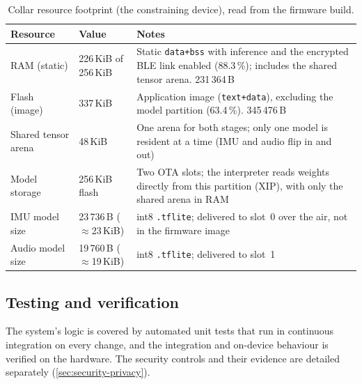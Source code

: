 \begin{table}[ht]
  \centering
  \caption{Collar resource footprint (the constraining device), read from the firmware build.}
  \label{tab:footprint}
  \begin{tabularx}{\textwidth}{@{}llX@{}}
    \toprule
    \textbf{Resource} & \textbf{Value} & \textbf{Notes} \\
    \midrule
    RAM (static)        & 226\,KiB of 256\,KiB & Static \texttt{data+bss} with inference and the encrypted
                                                 BLE link enabled (88.3\,\%); includes the shared tensor
                                                 arena. 231\,364\,B \\
    Flash (image)       & 337\,KiB             & Application image (\texttt{text+data}), excluding the
                                                 model partition (63.4\,\%). 345\,476\,B \\
    Shared tensor arena & 48\,KiB              & One arena for both stages; only one model is resident at a
                                                 time (IMU and audio flip in and out) \\
    Model storage       & 256\,KiB flash       & Two OTA slots; the interpreter reads weights directly from
                                                 this partition (XIP), with only the shared arena in RAM \\
    IMU model size      & 23\,736\,B ($\approx$23\,KiB) & int8 \texttt{.tflite}; delivered to slot~0 over
                                                 the air, not in the firmware image \\
    Audio model size    & 19\,760\,B ($\approx$19\,KiB) & int8 \texttt{.tflite}; delivered to slot~1 \\
    \bottomrule
  \end{tabularx}
\end{table}

\subsection{Testing and verification}

The system's logic is covered by automated unit tests that run in continuous integration on every change,
and the integration and on-device behaviour is verified on the hardware. The security controls and their
evidence are detailed separately (\cref{sec:security-privacy}).

